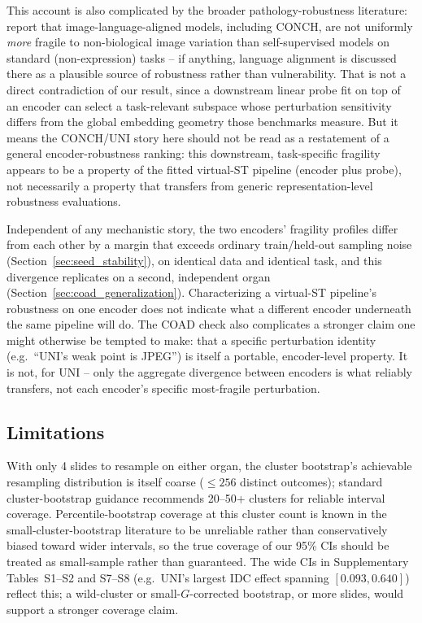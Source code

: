 \documentclass[11pt]{article}
\begin{document}
This account is also complicated by the broader pathology-robustness literature: \citet{pathorob_2026} report that image-language-aligned models, including CONCH, are not uniformly \emph{more} fragile to non-biological image variation than self-supervised models on standard (non-expression) tasks -- if anything, language alignment is discussed there as a plausible source of robustness rather than vulnerability. That is not a direct contradiction of our result, since a downstream linear probe fit on top of an encoder can select a task-relevant subspace whose perturbation sensitivity differs from the global embedding geometry those benchmarks measure. But it means the CONCH/UNI story here should not be read as a restatement of a general encoder-robustness ranking: this downstream, task-specific fragility appears to be a property of the fitted virtual-ST pipeline (encoder plus probe), not necessarily a property that transfers from generic representation-level robustness evaluations.

Independent of any mechanistic story, the two encoders' fragility profiles differ from each other by a margin that exceeds ordinary train/held-out sampling noise (Section~\ref{sec:seed_stability}), on identical data and identical task, and this divergence replicates on a second, independent organ (Section~\ref{sec:coad_generalization}). Characterizing a virtual-ST pipeline's robustness on one encoder does not indicate what a different encoder underneath the same pipeline will do. The COAD check also complicates a stronger claim one might otherwise be tempted to make: that a specific perturbation identity (e.g.\ ``UNI's weak point is JPEG'') is itself a portable, encoder-level property. It is not, for UNI -- only the aggregate divergence between encoders is what reliably transfers, not each encoder's specific most-fragile perturbation.

\subsection{Limitations}
\label{sec:limitations}

With only 4 slides to resample on either organ, the cluster bootstrap's achievable resampling distribution is itself coarse ($\le 256$ distinct outcomes); standard cluster-bootstrap guidance recommends 20--50+ clusters for reliable interval coverage. Percentile-bootstrap coverage at this cluster count is known in the small-cluster-bootstrap literature to be unreliable rather than conservatively biased toward wider intervals, so the true coverage of our 95\% CIs should be treated as small-sample rather than guaranteed. The wide CIs in Supplementary Tables~S1--S2 and S7--S8 (e.g.\ UNI's largest IDC effect spanning $[0.093, 0.640]$) reflect this; a wild-cluster or small-$G$-corrected bootstrap, or more slides, would support a stronger coverage claim.
\end{document}
